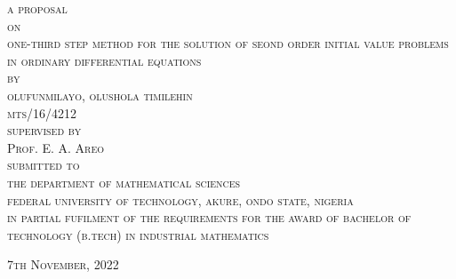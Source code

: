 \documentclass[12pt]{article}
\begin{document}
\begin{titlepage}
	\begin{center}
		\Large \textsc{a proposal}\\
		[5mm]
		\Large \textsc{on}\\
		[5mm]
		\Large \textsc{one-third step method for the solution of seond order initial value problems in ordinary differential equations}\\
		[5mm]
		\Large \textsc{by}\\
		[5mm]
		\Large \textsc{olufunmilayo, olushola timilehin \\ mts/16/4212}\\
		[5mm]
		\Large \textsc{supervised by}\\
		\Large \textsc{Prof. E. A. Areo}\\
		[5mm]
		\Large \textsc{submitted to}\\
		\Large \textsc{the department of mathematical sciences} \\ 
		\Large \textsc{federal university of technology, akure, ondo state, nigeria}\\
		[5mm]
		\Large \textsc{in partial fufilment of the requirements for the award of bachelor of technology (b.tech) in industrial mathematics}\\
		[12mm]
	\end{center}
	
	\begin{flushright}
		\large \textsc{7th November, 2022}
	\end{flushright}

\end{titlepage}

\newpage
{}
\end{document}
